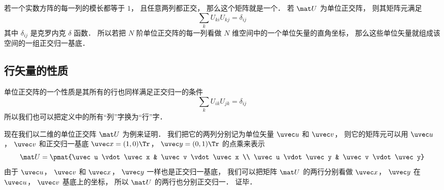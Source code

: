 

若一个实数方阵的每一列的模长都等于 $1$， 且任意两列都正交， 那么这个矩阵就是一个． 若 $\mat U$ 为单位正交阵， 则其矩阵元满足
\begin{equation}
\sum_k U_{ki} U_{kj} = \delta_{ij}
\end{equation}
其中 $\delta_{ij}$ 是克罗内克 $\delta$ 函数． 所以若把 $N$ 阶单位正交阵的每一列看做 $N$ 维空间中的一个单位矢量的直角坐标， 那么这些单位矢量就组成该空间的一组正交归一基底．

\subsection{行矢量的性质}
单位正交阵的一个性质是其所有的行也同样满足正交归一的条件
\begin{equation}
\sum_k U_{ik} U_{jk} = \delta_{ij}
\end{equation}
所以我们也可以把定义中的所有“列”字换为“行”字．

现在我们以二维的单位正交阵 $\mat U$ 为例来证明． 我们把它的两列分别记为单位矢量 $\uvec u$ 和 $\uvec v$， 则它的矩阵元可以用 $\uvec u$， $\uvec v$ 和正交归一基底 $\uvec x = (1, 0)\Tr$， $\uvec y = (0, 1)\Tr$ 的点乘来表示
\begin{equation}\label{UOrM_eq3}
\mat U = \pmat{\uvec u \vdot \uvec x & \uvec v \vdot \uvec x \\
\uvec u \vdot \uvec y & \uvec v \vdot \uvec y}
\end{equation}
由于 $\uvec u$， $\uvec v$ 和 $\uvec x$， $\uvec y$ 一样也是正交归一基底， 我们可以把矩阵 $\mat U$ 的两行分别看做 $\uvec x$， $\uvec y$ 在 $\uvec u$， $\uvec v$ 基底上的坐标， 所以 $\mat U$ 的两行也分别正交归一． 证毕．

